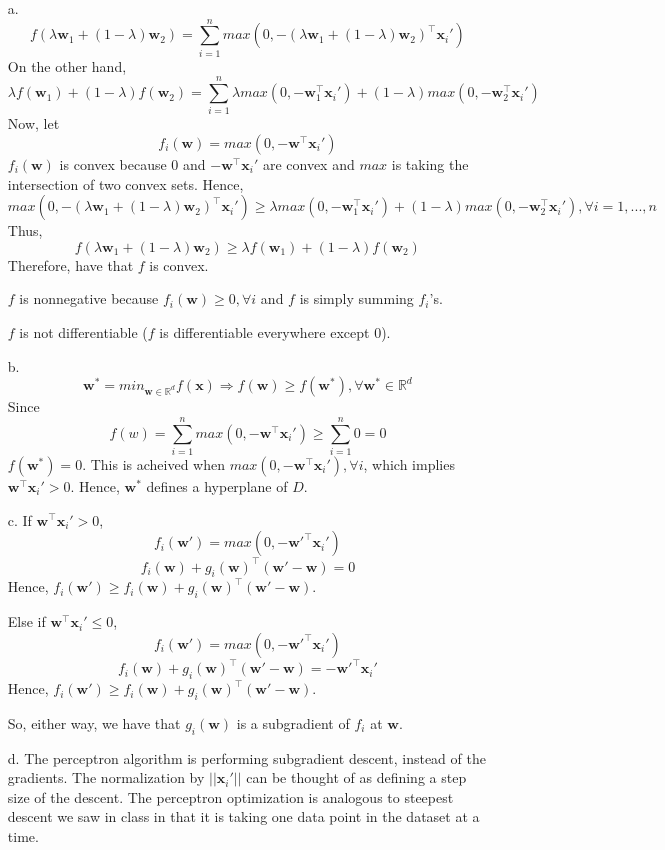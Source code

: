 \documentclass[11pt]{article}
\theoremstyle{remark}
\newcommand{\R}{\mathbb{R}}                     %
\newcommand{\bx}{\mathbf{x}}
\newcommand{\bw}{\mathbf{w}}
\begin{document}
\color{blue}
\begin{itemize}
\item[a.] $$f(\lambda \bw_1+(1-\lambda)\bw_2)=\sum_{i=1}^n max(0,-(\lambda \bw_1+(1-\lambda)\bw_2)^\intercal \bx_i')$$
On the other hand, 
$$\lambda f(\bw_1)+(1-\lambda)f(\bw_2) = \sum_{i=1}^n \lambda max(0,-\bw_1^\intercal \bx_i')+(1-\lambda)max(0,-\bw_2^\intercal \bx_i')$$
Now, let
$$f_i(\bw)=max(0,-\bw^\intercal \bx_i')$$
$f_i(\bw)$ is convex because $0$ and $-\bw^\intercal \bx_i'$ are convex and $max$ is taking the intersection of two convex sets. Hence, 
$$max(0,-(\lambda \bw_1+(1-\lambda)\bw_2)^\intercal \bx_i') \geq \lambda max(0,-\bw_1^\intercal \bx_i')+(1-\lambda)max(0,-\bw_2^\intercal \bx_i'), \forall i=1,...,n$$
Thus,
$$f(\lambda \bw_1+(1-\lambda)\bw_2) \geq \lambda f(\bw_1)+(1-\lambda)f(\bw_2)$$
Therefore, have that $f$ is convex.

$f$ is nonnegative because $f_i(\bw) \geq 0, \forall i$ and $f$ is simply summing $f_i$'s.

$f$ is not differentiable ($f$ is differentiable everywhere except 0).

\item[b.]
$$\bw^*=min_{\bw\in \R^d} f(\bx) \Rightarrow f(\bw) \geq f(\bw^*), \forall \bw^* \in \R^d$$
Since $$f(w)=\sum_{i=1}^n max(0,-\bw^\intercal \bx_i') \geq \sum_{i=1}^n 0 = 0$$
$f(\bw^*)=0$. This is acheived when $max(0,-\bw^\intercal \bx_i'), \forall i$, which implies $\bw^\intercal \bx_i' > 0$. Hence, $\bw^*$ defines a hyperplane of $D$.

\item[c.]
If $\bw^\intercal \bx_i' > 0$,
$$f_i(\bw')=max(0,-\bw'^\intercal \bx_i')$$
$$f_i(\bw)+g_i(\bw)^\intercal(\bw'-\bw)=0$$
Hence, $f_i(\bw')\geq f_i(\bw)+g_i(\bw)^\intercal(\bw'-\bw)$.

Else if $\bw^\intercal \bx_i' \leq 0$,
$$f_i(\bw')=max(0,-\bw'^\intercal \bx_i')$$
$$f_i(\bw)+g_i(\bw)^\intercal(\bw'-\bw)=-\bw'^\intercal \bx_i' $$
Hence, $f_i(\bw')\geq f_i(\bw)+g_i(\bw)^\intercal(\bw'-\bw)$.

So, either way, we have that $g_i(\bw)$ is a subgradient of $f_i$ at $\bw$.

\item[d.]
The perceptron algorithm is performing subgradient descent, instead of the gradients. The normalization by $||\bx_i'||$ can be thought of as defining a step size of the descent. The perceptron optimization is analogous to steepest descent we saw in class in that it is taking one data point in the dataset at a time.


\end{itemize}
\color{black}
\end{document}
